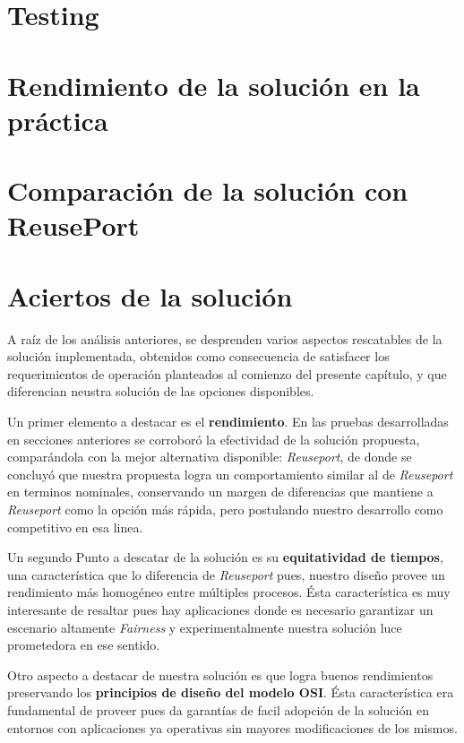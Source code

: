 \section{Testing}

\section{Rendimiento de la solución en la práctica}

\section{Comparación de la solución con ReusePort}

\section{Aciertos de la solución}

A raíz de los análisis anteriores, se desprenden varios aspectos rescatables de la solución implementada, obtenidos como consecuencia de satisfacer los requerimientos de operación planteados al comienzo del presente capítulo, y que diferencian neustra solución de las opciones disponibles.

Un primer elemento a destacar es el \textbf{rendimiento}. En las pruebas desarrolladas en secciones anteriores se corroboró la efectividad de la solución propuesta, comparándola con la mejor alternativa disponible: \emph{Reuseport}, de donde se concluyó que nuestra propuesta logra un comportamiento similar al de \emph{Reuseport} en terminos nominales, conservando un margen de diferencias que mantiene a \emph{Reuseport} como la opción más rápida, pero postulando nuestro desarrollo como competitivo en esa linea.

Un segundo Punto a descatar de la solución es su \textbf{equitatividad de tiempos}, una característica que lo diferencia de \emph{Reuseport} pues, nuestro diseño provee un rendimiento más homogéneo entre múltiples procesos. Ésta característica es muy interesante de resaltar pues hay aplicaciones donde es necesario garantizar un escenario altamente \emph{Fairness} y experimentalmente nuestra solución luce prometedora en ese sentido.

Otro aspecto a destacar de nuestra solución es que logra buenos rendimientos preservando los \textbf{principios de diseño del modelo OSI}. Ésta característica era fundamental de proveer pues da garantías de facil adopción de la solución en entornos con aplicaciones ya operativas sin mayores modificaciones de los mismos.

